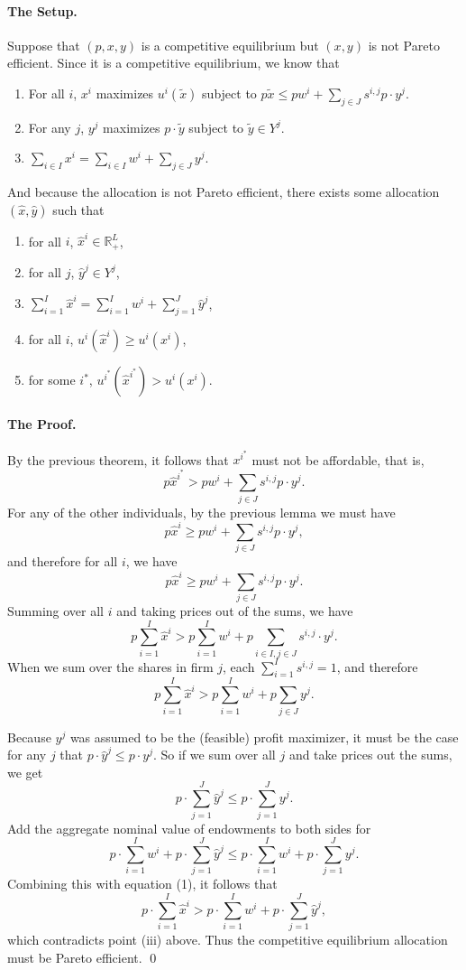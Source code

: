 \documentclass[12pt]{article}
\newcommand{\R}{\mathbb{R}}
\newcommand{\sumi}{\sum_{i=1}^I}
\newcommand{\sumj}{\sum_{j=1}^J}
\theoremstyle{definition}
\begin{document}
\paragraph{The Setup.} Suppose that $(p,x,y)$ is a competitive equilibrium but $(x,y)$ is not Pareto efficient. Since it is a competitive equilibrium, we know that
\begin{enumerate}
	\item For all $i$, $x^i$ maximizes $u^i(\tilde{x})$ subject to $p \tilde{x} \leq p w^i  + \sum_{j \in J} s^{i,j} p \cdot y^j$.
	\item For any $j$, $y^j$ maximizes $p \cdot \tilde{y}$ subject to $\tilde{y} \in Y^j$. 
	\item $\sum_{i \in I} x^i = \sum_{i \in I}w^i + \sum_{j \in J} y^j$. 
\end{enumerate}
And because the allocation is not Pareto efficient, there exists some allocation $(\hat{x}, \hat{y})$ such that 
\begin{enumerate}[label= \textbf{(\roman*)}]
	\item for all $i$, $\hat{x}^i \in \R^L_+$, 
	\item for all $j$, $\hat{y}^j \in Y^j$,
	\item $\sumi \hat{x}^i = \sumi w^i + \sumj \hat{y}^j$,
	\item for all $i$, $u^i(\hat{x}^i) \geq u^i(x^i)$, 
	\item for some $i^*$, $u^{i^*}(\hat{x}^{i^*}) > u^i(x^i)$.
\end{enumerate}

\paragraph{The Proof.}
By the previous theorem, it follows that $x^{i^*}$ must not be affordable, that is,
	\[p \hat{x}^{i^*} > p w^i  + \sum_{j \in J} s^{i,j} p \cdot y^j.\]
For any of the other individuals, by the previous lemma we must have
	\[p \hat{x}^{i} \geq p w^i  + \sum_{j \in J} s^{i,j} p \cdot y^j,\]	
and therefore for all $i$, we have 
	\[p \hat{x}^{i} \geq p w^i  + \sum_{j \in J} s^{i,j} p \cdot y^j.\]
Summing over all $i$ and taking prices out of the sums, we have
	\[p \sumi \hat{x}^{i} > p \sumi w^i  + p \sum_{i \in I,j \in J} s^{i,j} \cdot y^j.\]	
When we sum over the shares in firm $j$, each $\sumi s^{i,j}=1$, and therefore
\begin{equation}
	p \sumi \hat{x}^{i} > p \sumi w^i  + p \sum_{j \in J} y^j.
\end{equation}

	Because $y^j$ was assumed to be the (feasible) profit maximizer, it must be the case for any $j$ that $p \cdot \hat{y}^j \leq p\cdot y^j$. So if we sum over all $j$ and take prices out the sums, we get
	\[p \cdot \sumj \hat{y}^j \leq p\cdot \sumj y^j.	\]
Add the aggregate nominal value of endowments to both sides for 
	\[p \cdot \sumi w^i + p \cdot \sumj \hat{y}^j  \leq  p \cdot \sumi w^i + p\cdot \sumj y^j  .	\]
Combining this with equation (1), it follows that
		\[	p \cdot \sumi \hat{x}^i > p \cdot \sumi w^i + p \cdot \sumj \hat{y}^j,	\]
which contradicts point (iii) above. Thus the competitive equilibrium allocation must be Pareto efficient. \qed
\end{document}
